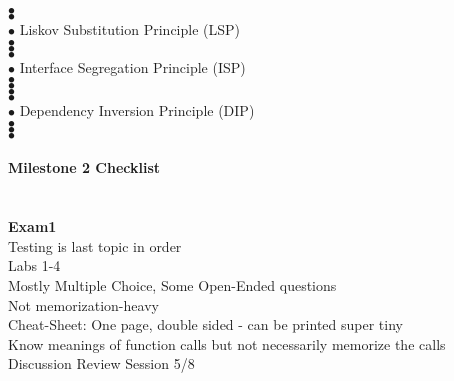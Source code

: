 \documentclass[11pt]{article}
\begin{document}
\indent\indent $\bullet$  \\
\indent\indent $\bullet$  \\
\indent $\bullet$ Liskov Substitution Principle (LSP) \\
\indent\indent $\bullet$  \\
\indent\indent $\bullet$  \\
\indent\indent $\bullet$  \\
\indent $\bullet$ Interface Segregation Principle (ISP) \\
\indent\indent $\bullet$  \\
\indent\indent $\bullet$  \\
\indent\indent $\bullet$  \\
\indent\indent $\bullet$  \\
\indent $\bullet$ Dependency Inversion Principle (DIP) \\
\indent\indent $\bullet$  \\
\indent\indent $\bullet$  \\
\indent\indent $\bullet$  \\
\\
\textbf{Milestone 2 Checklist}\\
\indent \\
\\
\textbf{Exam1}\\
\indent Testing is last topic in order \\
\indent Labs 1-4 \\
\indent Mostly Multiple Choice, Some Open-Ended questions\\
\indent Not memorization-heavy \\
\indent Cheat-Sheet: One page, double sided - can be printed super tiny \\
\indent Know meanings of function calls but not necessarily memorize the calls \\
\indent Discussion Review Session 5/8\\
\indent 
\end{document}
